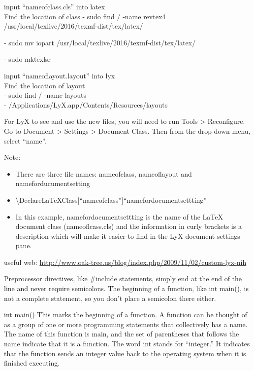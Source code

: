 input “nameofclass.cls” into latex\\
Find the location of class
- sudo find / -name revtex4\\
/usr/local/texlive/2016/texmf-dist/tex/latex/

- sudo mv iopart /usr/local/texlive/2016/texmf-dist/tex/latex/

- sudo mktexlsr

input “nameoflayout.layout” into lyx\\
Find the location of layout\\
- sudo find / -name layouts\\
- /Applications/LyX.app/Contents/Resources/layouts\\
\vspace{5mm}

For LyX to see and use the new files, you will need to run Tools > Reconfigure.
Go to Document > Settings > Document Class.  Then from the drop down menu, select “name”.\\
\vspace{5mm}

Note:
\begin{itemize}
  \item There are three file names: nameofclass, nameoflayout and nameforducumentsetting
  \item \textbackslash DeclareLaTeXClass[“nameofclass”]{“namefordocumentsettting”}
  \item In this example, namefordocumentsettting is the name of the LaTeX document class (nameoflcass.cls) and the information in curly brackets is a description which will make it easier to find in the LyX document settings pane.
\end{itemize}

useful web: \url{http://www.oak-tree.us/blog/index.php/2009/11/02/custom-lyx-nih}






Preprocessor directives, like $\#$include statements, simply end at the end of the line and never require semicolons. The beginning of a function, like int main(), is not a complete statement, so you don’t place a semicolon there either. 



int main() This marks the beginning of a function. A function can
be thought of as a group of one or more programming statements that
collectively has a name. The name of this function is main, and the
set of parentheses that follows the name indicate that it is a function.
The word int stands for \textquotedblleft integer.\textquotedblright{}
It indicates that the function sends an integer value back to the
operating system when it is finished executing. 

